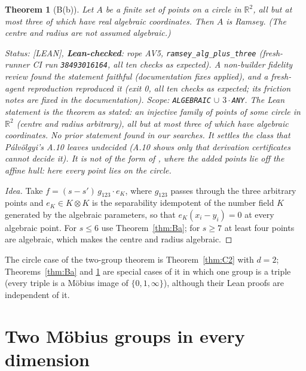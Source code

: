 \documentclass[11pt]{amsart}
\newcommand{\st}[1]{\textsf{[#1]}}
\newcommand{\R}{\mathbb{R}}
\theoremstyle{plain}
\newtheorem{theorem}{Theorem}[section]
\theoremstyle{definition}
\begin{document}
\begin{theorem}[B(b)]\label{thm:Bb}
Let $A$ be a finite set of points on a circle in $\R^2$, all but at most three of which have real
algebraic coordinates. Then $A$ is Ramsey. (The centre and radius are not assumed algebraic.)

\smallskip\noindent\emph{Status:} \st{LEAN}, \textbf{Lean-checked}: rope AV5,
\texttt{ramsey\_alg\_plus\_three} (fresh-runner CI run \texttt{38493016164}, all ten checks as
expected). A non-builder fidelity review found the statement faithful (documentation fixes
applied), and a fresh-agent reproduction reproduced it (exit 0, all ten checks as expected; its
friction notes are fixed in the documentation). Scope: \texttt{ALGEBRAIC} $\cup$
$3\cdot$\texttt{ANY}. The Lean statement is the theorem as stated: an injective family of points of
some circle in $\R^2$ (centre and radius arbitrary), all but at most three of which have algebraic
coordinates. No prior statement found in our searches. It settles the class that P\'alv\"olgyi's
A.10 \cite{Palvolgyi} leaves undecided (A.10 shows only that derivation certificates cannot
decide it). It is not of the form of \cite{Mirabi,Moore}, where the added points lie off the affine
hull: here every point lies on the circle.
\end{theorem}

\begin{proof}[Idea]
Take $f=(s-s')\,g_{123}\cdot e_K$, where $g_{123}$ passes through the three arbitrary points and
$e_K\in K\otimes K$ is the separability idempotent of the number field $K$ generated by the
algebraic parameters, so that $e_K(x_i-y_i)=0$ at every algebraic point. For $s\le6$ use
Theorem~\ref{thm:Ba}; for $s\ge7$ at least four points are algebraic, which makes the centre and
radius algebraic.
\end{proof}

The circle case of the two-group theorem is Theorem~\ref{thm:C2} with $d=2$; Theorems~\ref{thm:Ba} and \ref{thm:Bb} are special cases of it in which one group is a triple
(every triple is a M\"obius image of $\{0,1,\infty\}$), although their Lean proofs are independent of
it.

\section{Two M\"obius groups in every dimension}\label{sec:twogroups}
\end{document}
